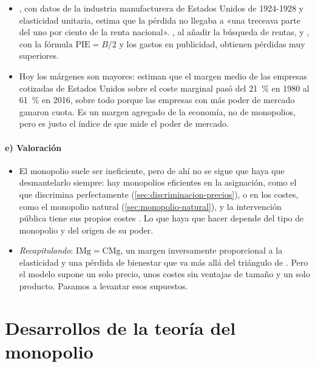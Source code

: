 \documentclass[11pt]{article}
\begin{document}
\begin{itemize}
\item \textcite{Harberger1954Monopoly}, con datos de la industria manufacturera de Estados Unidos de 1924-1928 y elasticidad unitaria, estima que la pérdida no llegaba a «una treceava parte del uno por ciento de la renta nacional»\nocite{Schmitz2012New}. \textcite{Posner1975Social}, al añadir la búsqueda de rentas, y \textcite{CowlingMueller1978Social}, con la fórmula $\mathrm{PIE}=B/2$ y los gastos en publicidad, obtienen pérdidas muy superiores.
\item Hoy los márgenes son mayores: \textcite{DeLoeckerEeckhoutUnger2020Rise} estiman que el margen medio de las empresas cotizadas de Estados Unidos sobre el coste marginal pasó del 21~\% en 1980 al 61~\% en 2016, sobre todo porque las empresas con más poder de mercado ganaron cuota. Es un margen agregado de la economía, no de monopolios, pero es justo el índice de  que mide el poder de mercado.
\end{itemize}

\paragraph{e) Valoración}

\begin{itemize}
\item El monopolio suele ser ineficiente, pero de ahí no se sigue que haya que desmantelarlo siempre: hay monopolios eficientes en la asignación, como el que discrimina perfectamente (\ref{sec:discriminacion-precios}), o en los costes, como el monopolio natural (\ref{sec:monopolio-natural}), y la intervención pública tiene sus propios costes . Lo que haya que hacer depende del tipo de monopolio y del origen de su poder.
\item \emph{Recapitulando}: $\mathrm{IMg}=\mathrm{CMg}$, un margen inversamente proporcional a la elasticidad y una pérdida de bienestar que va más allá del triángulo de . Pero el modelo supone un solo precio, unos costes sin ventajas de tamaño y un solo producto. Pasamos a levantar esos supuestos.
\end{itemize}


\section{Desarrollos de la teoría del monopolio}\label{sec:desarrollos-teoria-monopolio}
\end{document}
